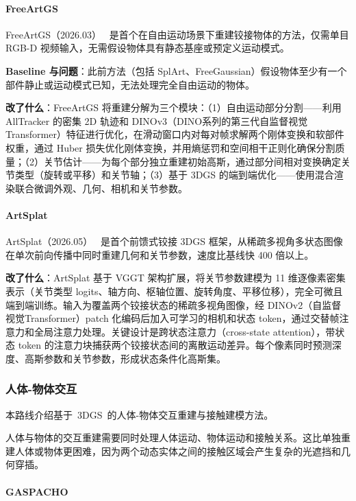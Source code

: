 \paragraph{FreeArtGS}

FreeArtGS（2026.03）~\cite{2603_22102} 是首个在自由运动场景下重建铰接物体的方法，仅需单目 RGB-D 视频输入，无需假设物体具有静态基座或预定义运动模式。

\textbf{Baseline 与问题}：此前方法（包括 SplArt、FreeGaussian）假设物体至少有一个部件静止或运动模式已知，无法处理完全自由运动的物体。

\textbf{改了什么}：FreeArtGS 将重建分解为三个模块：（1）自由运动部分分割——利用 AllTracker 的密集 2D 轨迹和 DINOv3（DINO系列的第三代自监督视觉Transformer）特征进行优化，在滑动窗口内对每对帧求解两个刚体变换和软部件权重，通过 Huber 损失优化刚体变换，并用熵惩罚和空间相干正则化确保分割质量；（2）关节估计——为每个部分独立重建初始高斯，通过部分间相对变换确定关节类型（旋转或平移）和关节轴；（3）基于 3DGS 的端到端优化——使用混合渲染联合微调外观、几何、相机和关节参数。

\paragraph{ArtSplat}

ArtSplat（2026.05）~\cite{2605_24304} 是首个前馈式铰接 3DGS 框架，从稀疏多视角多状态图像在单次前向传播中同时重建几何和关节参数，速度比基线快 400 倍以上。

\textbf{改了什么}：ArtSplat 基于 VGGT 架构扩展，将关节参数建模为 11 维逐像素密集表示（关节类型 logits、轴方向、枢轴位置、旋转角度、平移位移），完全可微且端到端训练。输入为覆盖两个铰接状态的稀疏多视角图像，经 DINOv2（自监督视觉Transformer）patch 化编码后加入可学习的相机和状态 token，通过交替帧注意力和全局注意力处理。关键设计是跨状态注意力（cross-state attention），带状态 token 的注意力块捕获两个铰接状态间的离散运动差异。每个像素同时预测深度、高斯参数和关节参数，形成状态条件化高斯集。

\subsubsection{人体-物体交互}

本路线介绍基于~3DGS~的人体-物体交互重建与接触建模方法。

人体与物体的交互重建需要同时处理人体运动、物体运动和接触关系。这比单独重建人体或物体更困难，因为两个动态实体之间的接触区域会产生复杂的光遮挡和几何穿插。

\paragraph{GASPACHO}

